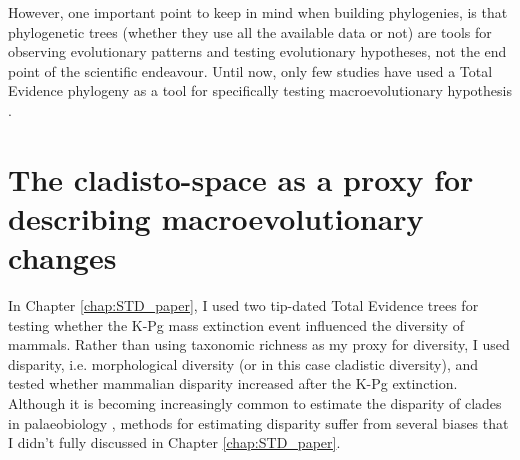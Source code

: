 However, one important point to keep in mind when building phylogenies, is that phylogenetic trees (whether they use all the available data or not) are tools for observing evolutionary patterns and testing evolutionary hypotheses, not the end point of the scientific endeavour.
Until now, only few studies have used a Total Evidence phylogeny as a tool for specifically testing macroevolutionary hypothesis \citep[e.g.][]{Slater2012MEE,Wood01032013,Dembo2015}.

\section{The cladisto-space as a proxy for describing macroevolutionary changes} %
In Chapter \ref{chap:STD_paper}, I used two tip-dated Total Evidence trees for testing whether the K-Pg mass extinction event influenced the diversity of mammals.
Rather than using taxonomic richness as my proxy for diversity, I used disparity, i.e. morphological diversity (or in this case cladistic diversity), and tested whether mammalian disparity increased after the K-Pg extinction.
Although it is becoming increasingly common to estimate the disparity of clades in palaeobiology \citep[e.g.]{Butler2012,brusattedinosaur2012,toljagictriassic-jurassic2013,brusattegradual2014,bensonfaunal2014,Claddis,Close2015}, methods for estimating disparity suffer from several biases that I didn't fully discussed in Chapter \ref{chap:STD_paper}.

